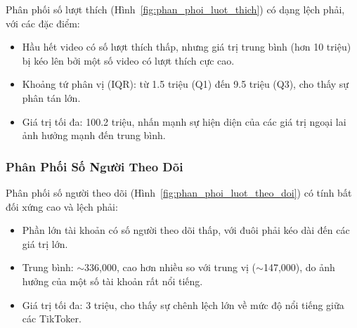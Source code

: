\noindent
Phân phối số lượt thích (Hình~\ref{fig:phan_phoi_luot_thich}) có dạng lệch phải, với các đặc điểm:
\begin{itemize}
    \item Hầu hết video có số lượt thích thấp, nhưng giá trị trung bình (hơn 10 triệu) bị kéo lên bởi một số video có lượt thích cực cao.
    
    \item Khoảng tứ phân vị (IQR): từ 1.5 triệu (Q1) đến 9.5 triệu (Q3), cho thấy sự phân tán lớn.
    
    \item Giá trị tối đa: 100.2 triệu, nhấn mạnh sự hiện diện của các giá trị ngoại lai ảnh hưởng mạnh đến trung bình.
\end{itemize}

\subsubsection{Phân Phối Số Người Theo Dõi}
\begin{figure}[H]
\end{figure}

\noindent
Phân phối số người theo dõi (Hình~\ref{fig:phan_phoi_luot_theo_doi}) có tính bất đối xứng cao và lệch phải:
\begin{itemize}
    \item Phần lớn tài khoản có số người theo dõi thấp, với đuôi phải kéo dài đến các giá trị lớn.
    
    \item Trung bình: $\sim$336,000, cao hơn nhiều so với trung vị ($\sim$147,000), do ảnh hưởng của một số tài khoản rất nổi tiếng.
    
    \item Giá trị tối đa: 3 triệu, cho thấy sự chênh lệch lớn về mức độ nổi tiếng giữa các TikToker.
\end{itemize}


